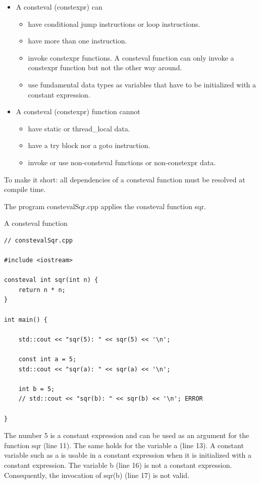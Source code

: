 \begin{itemize}
\item 
A consteval (constexpr) can
\begin{itemize}
\item 
have conditional jump instructions or loop instructions.

\item 
have more than one instruction.

\item 
invoke constexpr functions. A consteval function can only invoke a constexpr function but not the other way around.

\item 
use fundamental data types as variables that have to be initialized with a constant expression.
\end{itemize}

\item 
A consteval (constexpr) function cannot
\begin{itemize}
\item 
have static or thread\_local data.

\item 
have a try block nor a goto instruction.

\item 
invoke or use non-consteval functions or non-constexpr data.
\end{itemize}
\end{itemize}

To make it short: all dependencies of a consteval function must be resolved at compile time.

The program constevalSqr.cpp applies the consteval function sqr.

\noindent
A consteval function
\begin{lstlisting}[style=styleCXX]
// constevalSqr.cpp

#include <iostream>

consteval int sqr(int n) {
	return n * n;
}

int main() {

	std::cout << "sqr(5): " << sqr(5) << '\n';
	
	const int a = 5;
	std::cout << "sqr(a): " << sqr(a) << '\n';
	
	int b = 5;
	// std::cout << "sqr(b): " << sqr(b) << '\n'; ERROR

}
\end{lstlisting}

The number 5 is a constant expression and can be used as an argument for the function sqr (line 11). The same holds for the variable a (line 13). A constant variable such as a is usable in a constant expression when it is initialized with a constant expression. The variable b (line 16) is not a constant expression. Consequently, the invocation of sqr(b) (line 17) is not valid.

